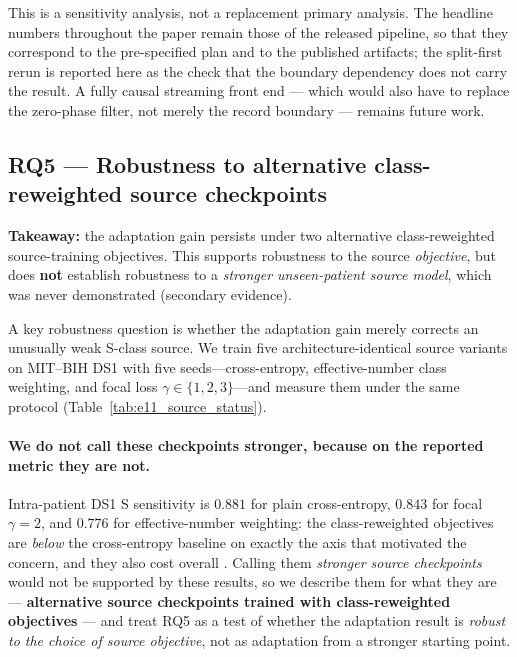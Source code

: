 This is a sensitivity analysis, not a replacement primary analysis. The headline
numbers throughout the paper remain those of the released pipeline, so that they
correspond to the pre-specified plan and to the published artifacts; the
split-first rerun is reported here as the check that the boundary dependency
does not carry the result. A fully causal streaming front end --- which would
also have to replace the zero-phase filter, not merely the record boundary ---
remains future work.






\subsection{RQ5 --- Robustness to alternative class-reweighted source checkpoints}

\textbf{Takeaway:} the adaptation gain persists under two alternative
class-reweighted source-training objectives. This supports robustness to the
source \emph{objective}, but does \textbf{not} establish robustness to a
\emph{stronger unseen-patient source model}, which was never demonstrated
(secondary evidence).

A key robustness question is whether the adaptation gain merely corrects an
unusually weak S-class source. We train five architecture-identical source
variants on MIT--BIH DS1 with five seeds---cross-entropy, effective-number class
weighting, and focal loss $\gamma\in\{1,2,3\}$---and measure them under the same
protocol (Table~\ref{tab:e11_source_status}).

\paragraph{We do not call these checkpoints stronger, because on the reported
metric they are not.} Intra-patient DS1 S sensitivity is $0.881$ for plain
cross-entropy, $0.843$ for focal $\gamma{=}2$, and $0.776$ for effective-number
weighting: the class-reweighted objectives are \emph{below} the cross-entropy
baseline on exactly the axis that motivated the concern, and they also cost
overall \macrof{}. Calling them \emph{stronger source checkpoints} would not be
supported by these results, so we describe them for what they are ---
\textbf{alternative source checkpoints trained with class-reweighted
objectives} --- and treat RQ5 as a test of whether the adaptation result is
\emph{robust to the choice of source objective}, not as adaptation from a
stronger starting point.

